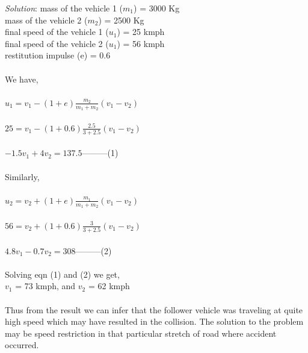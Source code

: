 \textit{Solution}:
mass of the vehicle 1 ($ m_1 $) = 3000 Kg\\
mass of the vehicle 2 ($ m_2 $) = 2500 Kg\\
final speed of the vehicle 1 ($ u_1 $) = 25 kmph\\
final speed of the vehicle 2 ($ u_1 $) = 56 kmph\\
restitution impulse (e) = 0.6\\\\
We have,\\\\
$ 	u_1 = v_1 - (1 + e) \frac{m_2}{m_1 + m_2} (v_1 - v_2) $\\\\
$ 25 = v_1 - (1 + 0.6) \frac{2.5}{3 + 2.5} (v_1 - v_2) $\\\\
$ -1.5 v_1 + 4 v_2 =  137.5 $---------(1)\\\\
Similarly,\\\\
$ 	u_2 = v_2 + (1 + e) \frac{m_1}{m_1 + m_2} (v_1 - v_2) $\\\\
$ 	56 = v_2 + (1 + 0.6) \frac{3}{3 + 2.5} (v_1 - v_2) $\\\\
$ 4.8 v_1 - 0.7 v_2 =  308 $---------(2)\\\\
Solving eqn (1) and (2) we get,\\
$ v_1 $ = 73 kmph, and $ v_2 $ = 62 kmph\\\\
Thus from the result we can infer that the follower vehicle was traveling at quite high speed which may have resulted in the collision. The solution to the problem may be speed restriction in that particular stretch of road where accident occurred.
